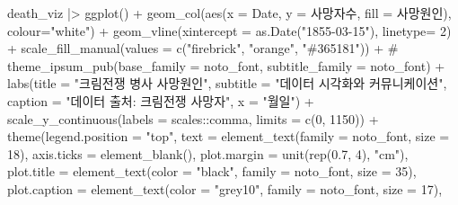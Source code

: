 \documentclass[
  letterpaper,
  chapter,a4paper,showtrims,openright,hidelinks]{oblivoir}
\newenvironment{Shaded}{\begin{snugshade}}{\end{snugshade}}
\newcommand{\AttributeTok}[1]{\textcolor[rgb]{0.40,0.45,0.13}{#1}}
\newcommand{\CommentTok}[1]{\textcolor[rgb]{0.37,0.37,0.37}{#1}}
\newcommand{\DecValTok}[1]{\textcolor[rgb]{0.68,0.00,0.00}{#1}}
\newcommand{\FloatTok}[1]{\textcolor[rgb]{0.68,0.00,0.00}{#1}}
\newcommand{\FunctionTok}[1]{\textcolor[rgb]{0.28,0.35,0.67}{#1}}
\newcommand{\NormalTok}[1]{\textcolor[rgb]{0.00,0.23,0.31}{#1}}
\newcommand{\SpecialCharTok}[1]{\textcolor[rgb]{0.37,0.37,0.37}{#1}}
\newcommand{\StringTok}[1]{\textcolor[rgb]{0.13,0.47,0.30}{#1}}
\begin{document}
\begin{Shaded}
\begin{Highlighting}[]
\NormalTok{death\_viz }\SpecialCharTok{|\textgreater{}} 
  \FunctionTok{ggplot}\NormalTok{() }\SpecialCharTok{+}
    \FunctionTok{geom\_col}\NormalTok{(}\FunctionTok{aes}\NormalTok{(}\AttributeTok{x =}\NormalTok{ Date, }\AttributeTok{y =}\NormalTok{ 사망자수, }\AttributeTok{fill =}\NormalTok{ 사망원인), }\AttributeTok{colour=}\StringTok{"white"}\NormalTok{) }\SpecialCharTok{+}
    \FunctionTok{geom\_vline}\NormalTok{(}\AttributeTok{xintercept =} \FunctionTok{as.Date}\NormalTok{(}\StringTok{"1855{-}03{-}15"}\NormalTok{), }\AttributeTok{linetype=} \DecValTok{2}\NormalTok{) }\SpecialCharTok{+}
    \FunctionTok{scale\_fill\_manual}\NormalTok{(}\AttributeTok{values =} \FunctionTok{c}\NormalTok{(}\StringTok{"firebrick"}\NormalTok{, }\StringTok{"orange"}\NormalTok{, }\StringTok{"\#365181"}\NormalTok{)) }\SpecialCharTok{+} 
    \CommentTok{\# theme\_ipsum\_pub(base\_family = noto\_font, subtitle\_family = noto\_font) +}
    \FunctionTok{labs}\NormalTok{(}\AttributeTok{title =} \StringTok{"크림전쟁 병사 사망원인"}\NormalTok{, }
         \AttributeTok{subtitle =} \StringTok{"데이터 시각화와 커뮤니케이션"}\NormalTok{, }
         \AttributeTok{caption =} \StringTok{"데이터 출처: 크림전쟁 사망자"}\NormalTok{,}
         \AttributeTok{x =} \StringTok{"월일"}\NormalTok{) }\SpecialCharTok{+} 
    \FunctionTok{scale\_y\_continuous}\NormalTok{(}\AttributeTok{labels =}\NormalTok{ scales}\SpecialCharTok{::}\NormalTok{comma, }\AttributeTok{limits =} \FunctionTok{c}\NormalTok{(}\DecValTok{0}\NormalTok{, }\DecValTok{1150}\NormalTok{)) }\SpecialCharTok{+}
    \FunctionTok{theme}\NormalTok{(}\AttributeTok{legend.position =} \StringTok{"top"}\NormalTok{, }
          \AttributeTok{text =} \FunctionTok{element\_text}\NormalTok{(}\AttributeTok{family =}\NormalTok{ noto\_font, }\AttributeTok{size =} \DecValTok{18}\NormalTok{),}
          \AttributeTok{axis.ticks =} \FunctionTok{element\_blank}\NormalTok{(),}
          \AttributeTok{plot.margin =} \FunctionTok{unit}\NormalTok{(}\FunctionTok{rep}\NormalTok{(}\FloatTok{0.7}\NormalTok{, }\DecValTok{4}\NormalTok{), }\StringTok{"cm"}\NormalTok{),}
          \AttributeTok{plot.title =} \FunctionTok{element\_text}\NormalTok{(}\AttributeTok{color =} \StringTok{"black"}\NormalTok{, }\AttributeTok{family =}\NormalTok{ noto\_font, }\AttributeTok{size =} \DecValTok{35}\NormalTok{),}
          \AttributeTok{plot.caption =} \FunctionTok{element\_text}\NormalTok{(}\AttributeTok{color =} \StringTok{"grey10"}\NormalTok{, }\AttributeTok{family =}\NormalTok{ noto\_font, }\AttributeTok{size =} \DecValTok{17}\NormalTok{),}

\end{Highlighting}
\end{Shaded}
\end{document}
